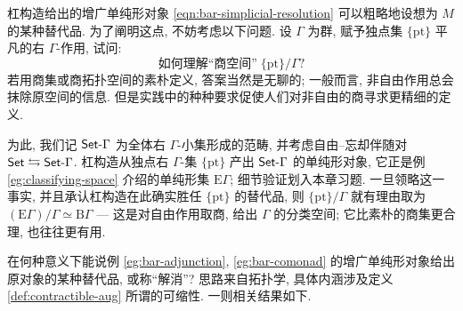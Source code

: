 杠构造给出的增广单纯形对象 \eqref{eqn:bar-simplicial-resolution} 可以粗略地设想为 $M$ 的某种替代品. 为了阐明这点, 不妨考虑以下问题. 设 $\Gamma$ 为群, 赋予独点集 $\{\mathrm{pt}\}$ 平凡的右 $\Gamma$-作用, 试问:
\[ \text{如何理解``商空间''}\; \{\mathrm{pt}\} / \Gamma ? \]
若用商集或商拓扑空间的素朴定义, 答案当然是无聊的; 一般而言, 非自由作用总会抹除原空间的信息. 但是实践中的种种要求促使人们对非自由的商寻求更精细的定义.

为此, 我们记 $\mathsf{Set}\text{-}\Gamma$ 为全体右 $\Gamma$-小集形成的范畴, 并考虑自由--忘却伴随对 $\mathsf{Set} \leftrightarrows \mathsf{Set}\text{-}\Gamma$. 杠构造从独点右 $\Gamma$-集 $\{\mathrm{pt}\}$ 产出 $\mathsf{Set}\text{-}\Gamma$ 的单纯形对象, 它正是例 \ref{eg:classifying-space} 介绍的单纯形集 $\mathrm{E}\Gamma$; 细节验证划入本章习题. 一旦领略这一事实, 并且承认杠构造在此确实胜任 $\{\mathrm{pt}\}$ 的替代品, 则 $\{\mathrm{pt}\}/\Gamma$ 就有理由取为 $(\mathrm{E}\Gamma) / \Gamma \simeq \mathrm{B}\Gamma$ --- 这是对自由作用取商, 给出 $\Gamma$ 的分类空间; 它比素朴的商集更合理, 也往往更有用.

在何种意义下能说例 \ref{eg:bar-adjunction}, \ref{eg:bar-comonad} 的增广单纯形对象给出原对象的某种替代品, 或称``解消''? 思路来自拓扑学, 具体内涵涉及定义 \ref{def:contractible-aug} 所谓的可缩性. 一则相关结果如下.

